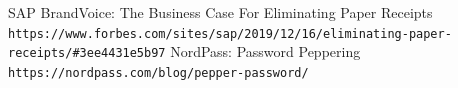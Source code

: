 \documentclass[11pt]{article}
\begin{document}
\begin{thebibliography}{9}
SAP BrandVoice: The Business Case For Eliminating Paper Receipts
\\\texttt{https://www.forbes.com/sites/sap/2019/12/16/eliminating-paper-receipts/\#3ee4431e5b97}
NordPass: Password Peppering
\\\texttt{https://nordpass.com/blog/pepper-password/}
\end{thebibliography}



\break
\end{document}
